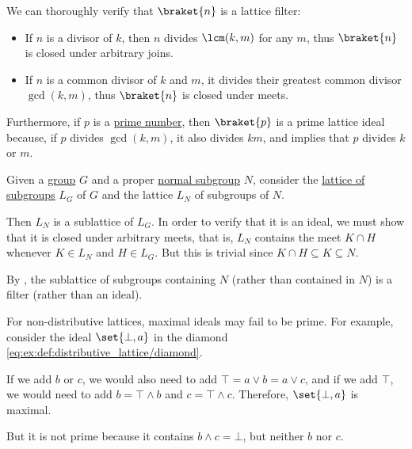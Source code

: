 \begin{example}
\begin{thmenum}
    We can thoroughly verify that \( \braket{ n } \) is a lattice filter:
    \begin{itemize}
      \item If \( n \) is a divisor of \( k \), then \( n \) divides \( \lcm(k, m) \) for any \( m \), thus \( \braket{ n } \) is closed under arbitrary joins.
      \item If \( n \) is a common divisor of \( k \) and \( m \), it divides their greatest common divisor \( \gcd(k, m) \), thus \( \braket{ n } \) is closed under meets.
    \end{itemize}

    Furthermore, if \( p \) is a \hyperref[def:prime_number]{prime number}, then \( \braket{ p } \) is a prime lattice ideal because, if \( p \) divides \( \gcd(k, m) \), it also divides \( km \), and  implies that \( p \) divides \( k \) or \( m \).

     Given a \hyperref[def:group]{group} \( G \) and a proper \hyperref[def:normal_subgroup]{normal subgroup} \( N \), consider the \hyperref[thm:fol_lattice_of_substructures]{lattice of subgroups} \( L_G \) of \( G \) and the lattice \( L_N \) of subgroups of \( N \).

    Then \( L_N \) is a sublattice of \( L_G \). In order to verify that it is an ideal, we must show that it is closed under arbitrary meets, that is, \( L_N \) contains the meet \( K \cap H \) whenever \( K \in L_N \) and \( H \in L_G \). But this is trivial since \( K \cap H \subseteq K \subseteq N \).

    By , the sublattice of subgroups containing \( N \) (rather than contained in \( N \)) is a filter (rather than an ideal).

     For non-distributive lattices, maximal ideals may fail to be prime. For example, consider the ideal \( \set{ \bot, a } \) in the diamond \eqref{eq:ex:def:distributive_lattice/diamond}.

    If we add \( b \) or \( c \), we would also need to add \( \top = a \vee b = a \vee c \), and if we add \( \top \), we would need to add \( b = \top \wedge b \) and \( c = \top \wedge c \). Therefore, \( \set{ \bot, a } \) is maximal.

    But it is not prime because it contains \( b \wedge c = \bot \), but neither \( b \) nor \( c \).
  \end{thmenum}
\end{example}

